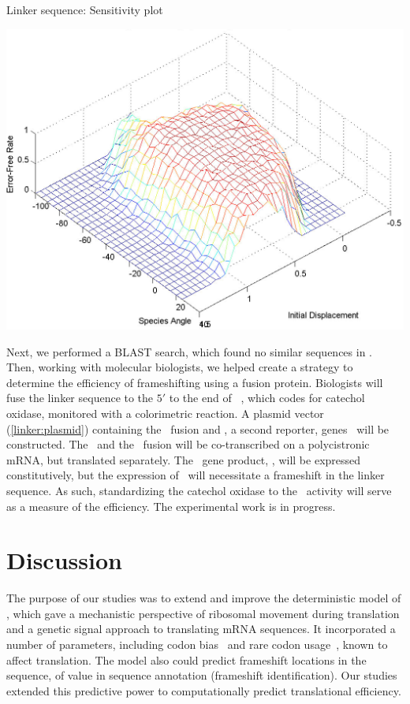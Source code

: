 \documentclass[twocolumn]{article}
\begin{document}
\begin{cfigure}
  \caption{Linker sequence: Sensitivity plot}
  \label{linker:sens}
  \includegraphics[width=\linewidth]{linker/sensitivity}
\end{cfigure}

Next, we performed a BLAST search, which found no similar sequences in 
\ecoli. Then, working with molecular biologists, we helped create a strategy to 
determine the efficiency of frameshifting using a fusion protein. 
Biologists will fuse the linker sequence to the $5'$ to the end of \xylE~\cite{fred1},
which codes for catechol oxidase, monitored with a 
colorimetric reaction.  A plasmid vector (\autoref{linker:plasmid})
containing the \xylE\ fusion and \lacZ, a second reporter, genes~\cite{fred2}
will be constructed.  The \lacZ\ and the \xylE\ fusion will be 
co-transcribed on a polycistronic mRNA, but translated
separately.  The \lacZ\ gene product, \bgals, will be expressed constitutively,
but the expression of \xylE\ will necessitate a frameshift in the linker sequence.
As such, standardizing the catechol oxidase to the \bgals\ activity
will serve as a measure of the  efficiency. The experimental
work is in progress.

\section{Discussion}
\label{section:discussion}

The purpose of our studies was to extend and improve the deterministic
model of \citeauthor{lalit:mechanics}, which gave a mechanistic
perspective of ribosomal movement during translation and a genetic
signal approach to translating mRNA sequences. It incorporated a
number of parameters, including
codon bias~\cite{ikemura} and rare codon usage~\cite{kane95}, known to
affect translation. The model also could predict frameshift locations
in the sequence, of value in sequence annotation (frameshift identification).
Our studies extended this predictive power to 
computationally predict translational efficiency.
\end{document}
